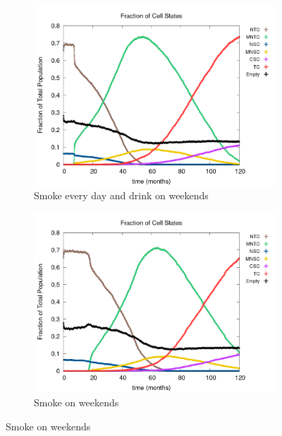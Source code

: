 \documentclass[\main/thesis.tex]{subfiles}
\begin{document}
\begin{figure}[H]
    \centering
    \begin{subfigure}[t]{.6\textwidth}
      \centering
      \includegraphics[width=\textwidth]{images/4_CarcinFunc/Fig8/numState_all_DrinkEveryday_SmokeWeekends.png}
      \caption{Smoke every day and drink on weekends}
      \label{fig:CarcinFunc_numState_DrinkEveryday_SmokeWeekends}
    \end{subfigure}
    \begin{subfigure}[t]{.6\textwidth}
      \centering
      \includegraphics[width=\textwidth]{images/4_CarcinFunc/Fig8/numState_all_SmokeWeekends.png}
      \caption{Smoke on weekends}
      \label{fig:CarcinFunc_numState_SmokeWeekends}
    \end{subfigure}

\end{figure}
\end{document}
